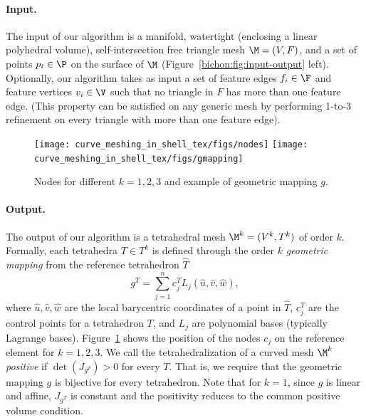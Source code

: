 \paragraph{Input.}
The input of our algorithm is a manifold, watertight (enclosing a linear polyhedral volume), self-intersection free triangle mesh $\M=(V,F)$, and a set of points $p_i\in\P$ on the surface of $\M$ (Figure~\ref{bichon:fig:input-output} left).   
 Optionally, our algorithm takes as input a set of feature edges $f_i\in\F$ and feature vertices $v_i\in\V$ such that no triangle in $F$ has more than one feature edge. (This property can be satisfied on any generic mesh by performing 1-to-3 refinement on every triangle with more than one feature edge).


\begin{figure}
    \centering
    \texttt{[image: curve\_meshing\_in\_shell\_tex/figs/nodes]}\hfill
    \texttt{[image: curve\_meshing\_in\_shell\_tex/figs/gmapping]}
    \caption{Nodes for different $k=1,2,3$ and example of geometric mapping $g$.}
    \label{bichon:fig:high-order}
\end{figure}

\paragraph{Output.}
The output of our algorithm is a tetrahedral mesh $\M^k = (V^k,T^k)$ of order $k$. Formally, each tetrahedra $T\in T^k$ is defined through the order $k$ \emph{geometric mapping} from the reference tetrahedron $\hat T$
\[
g^T = \sum_{j=1}^n c_j^T L_j(\hat u,\hat v,\hat w),
\]
where $\hat u,\hat v,\hat w$ are the local barycentric coordinates of a point in $\hat T$, $c_j^T$ are the control points for a tetrahedron $T$, and $L_j$ are polynomial bases (typically Lagrange bases). Figure~\ref{bichon:fig:high-order} shows the position of the nodes $c_j$ on the reference element for $k=1,2,3$. We call the tetrahedralization of a curved mesh $\M^k$ \emph{positive} if $\det(J_{g^T }) > 0$ for every $T$. That is, we require that the geometric mapping $g$ is bijective for every tetrahedron. Note that for $k=1$, since $g$ is linear and affine, $J_{g^T }$ is constant and the positivity reduces to the common positive volume condition.


